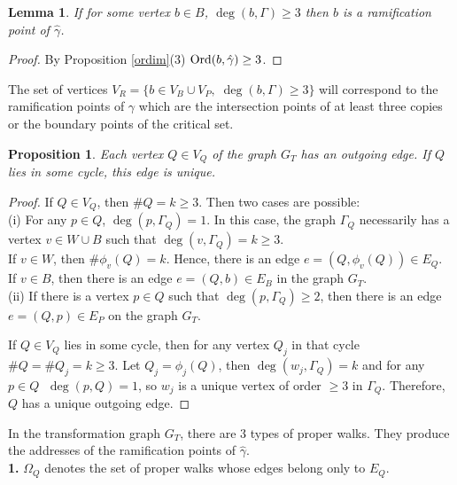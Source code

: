 \documentclass[11pt,reqno]{amsart}
\newtheorem{lemma}[theorem]{Lemma}
\newtheorem{proposition}[theorem]{Proposition}
\newcommand{\hga}{{\hat\gamma}}
\begin{document}
\begin{lemma}\label{ram_b}
    If for some vertex $b \in B$, $\deg(b, \Gamma) \geq 3$ then $b$ is a ramification point of $\hat{\gamma} $.
\end{lemma}
\begin{proof}
    By Proposition \ref{ordim}(3) ${\mathop{\rm Ord} \nolimits}(b, \hga) \ge 3 $. 
\end{proof}
The set of vertices $V_R = \{b \in V_B \cup V_P,\; \deg(b, \Gamma)\geq 3 \}$ will correspond to  the ramification points of $\gamma$ which are the intersection points of at least three copies or the boundary points of the critical set.

 \begin{proposition}\label{fin_cyc}
    Each vertex $Q \in V_Q$ of the graph $G_T$ has an outgoing edge. If $Q$ lies in some cycle, this edge is unique.
 \end{proposition}
 \begin{proof}
  If $Q \in V_Q$, then $\#Q = k \geq 3$. Then two cases are possible:\\
  (i) For any $p \in Q$,\; $\deg(p, \Gamma_{Q}) =1$. In this case, the graph $\Gamma_{Q}$  necessarily has a vertex $v\in W\cup B$ such that $\deg(v, \Gamma_{Q}) = k \geq 3$.\\ 
  If $v\in W$, then $\#\phi_v(Q)=k$. Hence, there is an edge $e=(Q,\phi_v(Q))\in E_Q$.\\
If $v\in B$, then 
  there is an edge $e=(Q,b) \in E_B$ in the graph $G_T$.\\
  (ii) If there is a vertex $p \in Q$ such that $\deg(p, \Gamma_{Q})\ge 2$, then there is an edge $e =(Q, p) \in E_P$ on the graph $G_T$.

  If $Q\in V_Q$ lies in some cycle, then for any vertex  $Q_j$ in that cycle $\#Q =\#Q_{j} = k \geq 3$. Let $Q_{j}=\phi_{j}(Q)$, then  $\deg(w_{j}, \Gamma_{Q}) = k $ and for any $p \in Q\;$ $\deg(p, Q) = 1$, so  $w_{j}$ is a unique vertex of order $\ge 3$ in $\Gamma_{Q}$. Therefore, $Q$ has a unique outgoing edge.
\end{proof}
     

 




In the transformation graph $G_T$, there are 3 types of proper walks. They produce the addresses of the ramification points of $\hga$.\\


{\bf  1.}   $\Omega_Q$  denotes the set of  proper walks whose edges belong only to $E_Q$.
\end{document}
